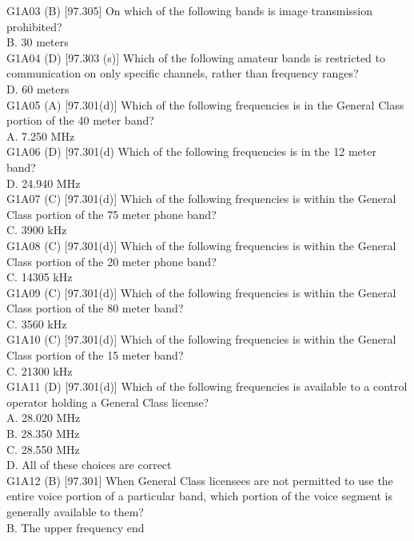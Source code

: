 \documentclass[12pt,letterpaper]{report}
\begin{document}
G1A03 (B) [97.305] On which of the following bands is image transmission prohibited? \\
B. 30 meters\\

G1A04 (D) [97.303 (s)] Which of the following amateur bands is restricted to communication on only specific channels, rather than frequency ranges?\\
D. 60 meters\\

G1A05 (A) [97.301(d)] Which of the following frequencies is in the General Class portion of the 40 meter band?\\
A. 7.250 MHz\\

G1A06 (D) [97.301(d) Which of the following frequencies is in the 12 meter band?\\
D. 24.940 MHz\\

G1A07 (C) [97.301(d)] Which of the following frequencies is within the General Class portion of the 75 meter phone band?\\
C. 3900 kHz\\

G1A08 (C) [97.301(d)] Which of the following frequencies is within the General Class portion of the 20 meter phone band?\\
C. 14305 kHz\\

G1A09 (C) [97.301(d)]  Which of the following frequencies is within the General Class portion of the 80 meter band?\\
C. 3560 kHz\\

G1A10 (C) [97.301(d)] Which of the following frequencies is within the General Class portion of the 15 meter band?\\
C. 21300 kHz\\

G1A11 (D) [97.301(d)]  Which of the following frequencies is available to a control operator holding a General Class license?\\
A. 28.020 MHz\\
B. 28.350 MHz\\
C. 28.550 MHz\\
D. All of these choices are correct\\

G1A12 (B) [97.301] When General Class licensees are not permitted to use the entire voice portion of a particular band, which portion of the voice segment is generally available to them? \\
B. The upper frequency end\\
\end{document}
